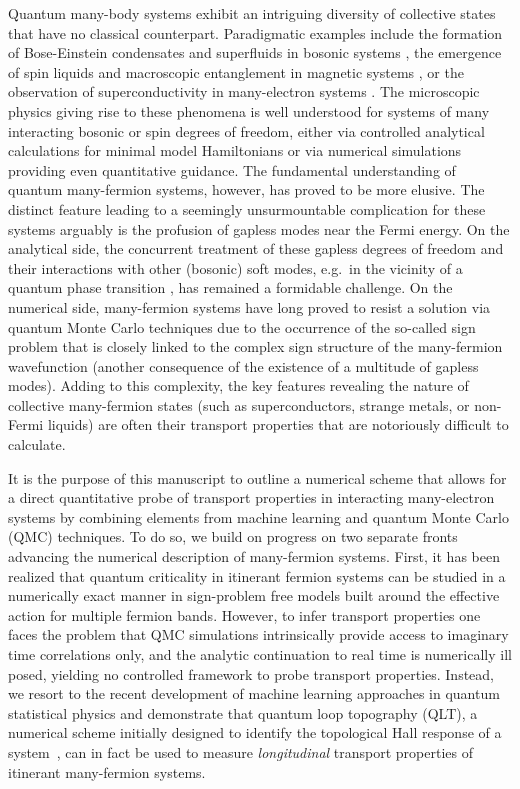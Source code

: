 \documentclass[amsmath,amssymb, aps, prx, longbibliography, twocolumn]{revtex4-1}
\begin{document}
Quantum many-body systems exhibit an intriguing diversity of collective states that have no classical counterpart.
Paradigmatic examples include the formation of Bose-Einstein condensates and superfluids in bosonic systems \cite{BEC}, 
the emergence of spin liquids and macroscopic entanglement in magnetic systems \cite{Balents2010}, 
or the observation of superconductivity in many-electron systems \cite{QuantumLiquids}. 
The microscopic physics giving rise to these phenomena is well understood for systems 
of many interacting bosonic or spin degrees of freedom, 
either via controlled analytical calculations for minimal model Hamiltonians or via numerical simulations
providing even quantitative guidance. The fundamental understanding of quantum many-fermion systems, however, 
has proved to be more elusive. The distinct feature leading to a seemingly unsurmountable complication
for these systems arguably is the profusion of gapless modes near the Fermi energy. 
On the analytical side, the concurrent treatment of these gapless degrees of freedom and their interactions with other (bosonic) soft modes,
e.g.~in the vicinity of a quantum phase transition \cite{Hertz1976,Millis1993}, has remained a formidable challenge.
On the numerical side, many-fermion systems have long proved to resist a solution via quantum Monte Carlo techniques
due to the occurrence of the so-called sign problem \cite{Loh1990} that is closely linked to the complex sign structure of the 
many-fermion wavefunction (another consequence of the existence of a multitude of gapless modes).
Adding to this complexity, the key features revealing the nature of collective many-fermion states 
(such as superconductors, strange metals, or non-Fermi liquids) are often their transport properties
that are notoriously difficult to calculate.   


It is the purpose of this manuscript to outline a numerical scheme that 
allows for a direct quantitative probe of transport properties in interacting many-electron systems
by combining elements from machine learning and quantum Monte Carlo (QMC)
techniques. 
To do so, we build on progress on two separate fronts advancing the numerical description of many-fermion systems.
First, it has been realized that quantum criticality in itinerant fermion systems can be studied in a numerically exact manner 
in sign-problem free models 
\cite{Berg2018}
built around the effective action for multiple fermion bands. 
However, to infer transport properties one faces the problem that QMC simulations intrinsically provide access to imaginary time correlations only, 
and the analytic continuation to real time is numerically ill posed, yielding no controlled framework
to probe transport properties. 
Instead, we resort to the recent development of machine learning approaches in quantum statistical physics and demonstrate that quantum loop topography (QLT), a numerical scheme initially designed to identify the topological Hall response of a system~\cite{qlt2016}, can in fact be used to measure {\em longitudinal} transport properties of itinerant many-fermion systems.
\end{document}
